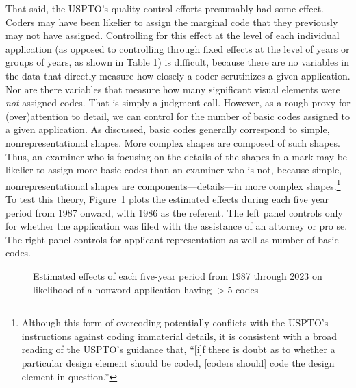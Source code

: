 \documentclass[letterpaper, 11pt, oneside]{article}
\begin{document}
That said, the USPTO's quality control efforts presumably had some effect. Coders may have been likelier to assign the marginal code that they previously may not have assigned. Controlling for this effect at the level of each individual application (as opposed to controlling through fixed effects at the level of years or groups of years, as shown in Table 1) is difficult, because there are no variables in the data that directly measure how closely a coder scrutinizes a given application. Nor are there variables that measure how many significant visual elements were \textit{not} assigned codes. That is simply a judgment call. However, as a rough proxy for (over)attention to detail, we can control for the number of basic codes assigned to a given application. As discussed, basic codes generally correspond to simple, nonrepresentational shapes. More complex shapes are composed of such shapes. Thus, an examiner who is focusing on the details of the shapes in a mark may be likelier to assign more basic codes than an examiner who is not, because simple, nonrepresentational shapes are components—details—in more complex shapes.\footnote{Although this form of overcoding potentially conflicts with the USPTO's instructions against coding immaterial details, it is consistent with a broad reading of the USPTO's guidance that, ``[i]f there is doubt as to whether a particular design element should be coded, [coders should] code the design element in question.''} To test this theory, Figure~\ref{fig:8} plots the estimated effects during each five year period from 1987 onward, with 1986 as the referent. The left panel controls only for whether the application was filed with the assistance of an attorney or pro se. The right panel controls for applicant representation as well as number of basic codes.

\begin{figure}[H]
\centering

\caption{\label{fig:8} Estimated effects of each five-year period from 1987 through 2023 on likelihood of a nonword application having $> 5$ codes}
\end{figure}
\end{document}
